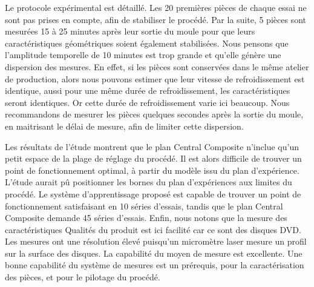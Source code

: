 Le protocole expérimental est détaillé.
Les 20 premières pièces de chaque essai ne sont pas prises en compte, afin de stabiliser le procédé.
Par la suite, 5 pièces sont mesurées 15 à 25 minutes après leur sortie du moule pour que leurs caractéristiques géométriques soient également stabilisées.
Nous pensons que l'amplitude temporelle de 10 minutes est trop grande et qu'elle génère une dispersion des mesures.
En effet, si les pièces sont conservées dans le même atelier de production, alors nous pouvons estimer que leur vitesse de refroidissement est identique, aussi pour une même durée de refroidissement, les caractéristiques seront identiques.
Or cette durée de refroidissement varie ici beaucoup. 
Nous recommandons de mesurer les pièces quelques secondes après la sortie du moule, en maitrisant le délai de mesure, afin de limiter cette dispersion.

Les résultats de l'étude montrent que le plan Central Composite n'inclue qu'un petit espace de la plage de réglage du procédé.
Il est alors difficile de trouver un point de fonctionnement optimal, à partir du modèle issu du plan d’expérience.
L'étude aurait pû positionner les bornes du plan d'expériences aux limites du procédé.
Le système d'apprentissage proposé est capable de trouver un point de fonctionnement satisfaisant en 10 séries d'essais, tandis que le plan Central Composite demande 45 séries d'essais.
Enfin, nous notons que la mesure des caractéristiques Qualités du produit est ici facilité car ce sont des disques DVD.
Les mesures ont une résolution élevé puisqu'un micromètre laser mesure un profil sur la surface des disques.
La capabilité du moyen de mesure est excellente.
Une bonne capabilité du système de mesures est un prérequis, pour la caractérisation des pièces, et pour le pilotage du procédé.

